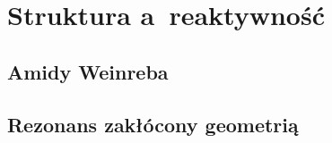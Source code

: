 \section{Struktura a~reaktywność}\label{literature:structure}


\subsection{Amidy Weinreba}\label{literature:structure:weinreb}
\subsection{Rezonans zakłócony geometrią}\label{literature:structure:geometry}

